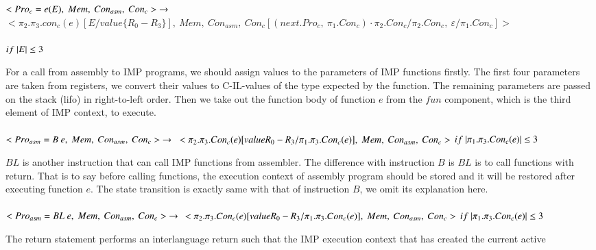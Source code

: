 \documentclass[conference]{IEEEtran}
\begin{document}
$<Pro_c=e(E),~Mem,~Con_{asm},~Con_c>~\rightarrow\\ \\$
$<\pi_2.\pi_3.con_c(e)[E/value\{R_0-R_3\}],~Mem,~Con_{asm},~Con_c[(next.Pro_c,~\pi_1.Con_c)\cdot \pi_2.Con_c/\pi_2.Con_c,~\varepsilon/\pi_1.Con_c]>$\\ \\
$if~|E|\leq 3 \\ \\$
\par For a call from assembly to IMP programs, we should assign values to the parameters of IMP functions firstly. The first four parameters are taken from registers, we convert their values to C-IL-values
of the type expected by the function. The remaining parameters are passed on the stack
(lifo) in right-to-left order. Then we take out the function body of function $e$ from the $fun$ component, which is the third element of IMP context, to execute.\\ \\
$<Pro_{asm}=B~e,~Mem,~Con_{asm},~Con_c>~\rightarrow\\ \\$
$<\pi_2.\pi_3.Con_c(e)[value{R_0-R_3}/\pi_1.\pi_3.Con_c(e)],~Mem,~Con_{asm},~Con_c>~\\ \\$$if~|\pi_1.\pi_3.Con_c(e)|\leq 3\\ \\$
\par $BL$ is another instruction that can call IMP functions from assembler. The difference with instruction $B$ is $BL$ is to call functions with return. That is to say before calling functions, the execution context of assembly program should be stored and it will be restored after executing function $e$. The state transition is exactly same with that of instruction $B$, we omit its explanation here. \\ \\
$<Pro_{asm}=BL~e,~Mem,~Con_{asm},~Con_c>~\rightarrow\\ \\$
$<\pi_2.\pi_3.Con_c(e)[value{R_0-R_3}/\pi_1.\pi_3.Con_c(e)],~Mem,~Con_{asm},~Con_c>~\\ \\$$if~|\pi_1.\pi_3.Con_c(e)|\leq 3\\ \\$
\par The return statement performs an interlanguage
return such that the IMP execution context that has created the current active
\end{document}
